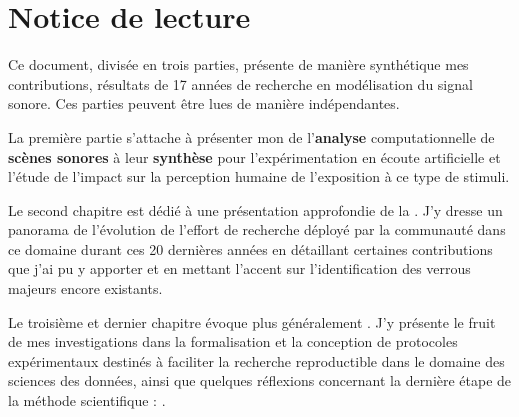 \chapter{\nmu Notice \nmu de lecture} \label{chap:notice}

Ce document, divisée en trois parties, présente de manière synthétique mes contributions, résultats de 17 années de recherche en modélisation du signal sonore. Ces parties peuvent être lues de manière indépendantes.

La première partie s'attache à présenter mon  de l'\textbf{analyse} computationnelle de \textbf{scènes sonores} à leur \textbf{synthèse} pour l'expérimentation en écoute artificielle et l'étude de l'impact sur la perception humaine de l'exposition à ce type de stimuli.

Le second chapitre est dédié à une présentation approfondie de la . J'y dresse un panorama de l'évolution de l'effort de recherche déployé par la communauté dans ce domaine durant ces 20 dernières années en détaillant certaines contributions que j'ai pu y apporter et en mettant l'accent sur l'identification des verrous majeurs encore existants.

Le troisième et dernier chapitre évoque plus généralement . J'y présente le fruit de mes investigations dans la formalisation et la conception de protocoles expérimentaux destinés à faciliter la recherche reproductible dans le domaine des sciences des données, ainsi que quelques réflexions concernant la dernière étape de la méthode scientifique : .

